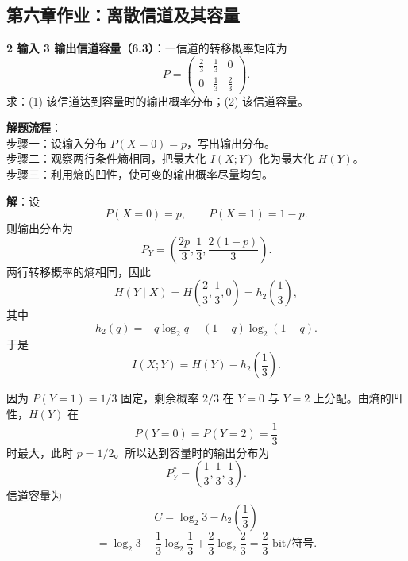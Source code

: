 \subsection{第六章作业：离散信道及其容量}

\begin{example}
\label{hw:ch6-3-channel-capacity}
\textbf{2 输入 3 输出信道容量（6.3）}：一信道的转移概率矩阵为
\[
P=
\begin{pmatrix}
\frac{2}{3} & \frac{1}{3} & 0\\
0 & \frac{1}{3} & \frac{2}{3}
\end{pmatrix}.
\]
求：(1) 该信道达到容量时的输出概率分布；(2) 该信道容量。

\noindent \textbf{解题流程}：\\[2pt]
步骤一：设输入分布 $P(X=0)=p$，写出输出分布。\\
步骤二：观察两行条件熵相同，把最大化 $I(X;Y)$ 化为最大化 $H(Y)$。\\
步骤三：利用熵的凹性，使可变的输出概率尽量均匀。

\textbf{解}：设
\[
P(X=0)=p,
\qquad
P(X=1)=1-p.
\]
则输出分布为
\[
P_Y=\left(\frac{2p}{3},\frac13,\frac{2(1-p)}{3}\right).
\]
两行转移概率的熵相同，因此
\[
H(Y\mid X)=H\left(\frac23,\frac13,0\right)=h_2\left(\frac13\right),
\]
其中
\[
h_2(q)=-q\log_2q-(1-q)\log_2(1-q).
\]
于是
\[
I(X;Y)=H(Y)-h_2\left(\frac13\right).
\]

因为 $P(Y=1)=1/3$ 固定，剩余概率 $2/3$ 在 $Y=0$ 与 $Y=2$ 上分配。由熵的凹性，$H(Y)$ 在
\[
P(Y=0)=P(Y=2)=\frac13
\]
时最大，此时 $p=1/2$。所以达到容量时的输出分布为
\[
P_Y^*=\left(\frac13,\frac13,\frac13\right).
\]
信道容量为
\[
C=\log_2 3-h_2\left(\frac13\right)
\]
\[
=\log_2 3+\frac13\log_2\frac13+\frac23\log_2\frac23
=\frac23\text{ bit/符号}.
\]
\end{example}

